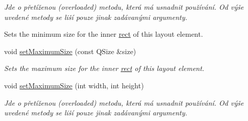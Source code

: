 \begin{DoxyCompactItemize}
\begin{DoxyCompactList}\small\item\em Jde o přetíženou (overloaded) metodu, která má usnadnit používání. Od výše uvedené metody se liší pouze jinak zadávanými argumenty.

Sets the minimum size for the inner \hyperlink{classQCPLayoutElement_affdfea003469aac3d0fac5f4e06171bc}{rect} of this layout element. \end{DoxyCompactList}\item 
void \hyperlink{classQCPLayoutElement_a74eb5280a737ab44833d506db65efd95}{set\+Maximum\+Size} (const Q\+Size \&size)
\begin{DoxyCompactList}\small\item\em Sets the maximum size for the inner \hyperlink{classQCPLayoutElement_affdfea003469aac3d0fac5f4e06171bc}{rect} of this layout element. \end{DoxyCompactList}\item 
\hypertarget{classQCPLayoutElement_a03e0e9c48f230217c529b0819f832d84}{}void \hyperlink{classQCPLayoutElement_a03e0e9c48f230217c529b0819f832d84}{set\+Maximum\+Size} (int width, int height)\label{classQCPLayoutElement_a03e0e9c48f230217c529b0819f832d84}

\begin{DoxyCompactList}\small\item\em Jde o přetíženou (overloaded) metodu, která má usnadnit používání. Od výše uvedené metody se liší pouze jinak zadávanými argumenty.


\end{DoxyCompactList}
\end{DoxyCompactItemize}
